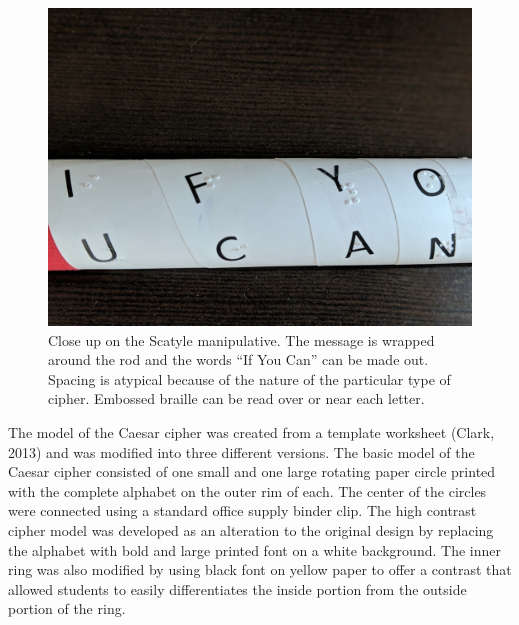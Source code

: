 \documentclass[11.5pt]{sig-alternate} %
\begin{document}
\begin{large}
\begin{figure}[!h]
    \centering
    \includegraphics[width=1\linewidth]{images/fig2.jpg}
    \caption{Close up on the Scatyle manipulative. The message is wrapped around the rod and the words “If You Can” can be made out. Spacing is atypical because of the nature of the particular type of cipher. Embossed braille can be read over or near  each letter.}
\end{figure}

The model of the Caesar cipher was created from a template worksheet (Clark, 2013) and was modified into three different versions. The basic model of the Caesar cipher consisted of one small and one large rotating  paper circle printed with the complete alphabet on the outer rim of each.  The center of the circles were connected using a standard office supply binder clip. The high contrast cipher model was developed as an alteration to the original design by replacing the alphabet with bold and large printed font on a white background. The inner ring was also modified by using black font on yellow paper to offer a contrast that allowed students to easily differentiates the inside portion from the outside portion of the ring. 
 

\end{large}
\end{document}
